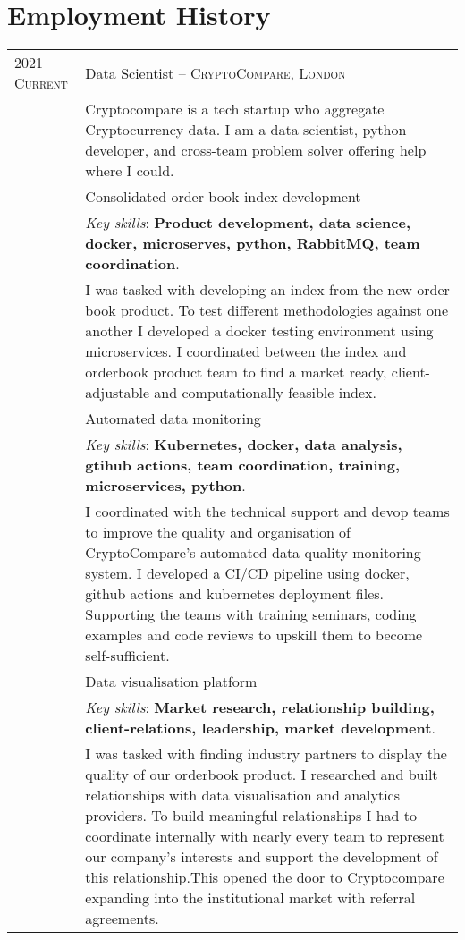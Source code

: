 \documentclass[a4paper,10pt]{article}
\newcommand{\tab}{\hspace{10 pt}}
\begin{document}
\section{Employment History}
\begin{tabular}{p{2.25cm}|p{15cm}}
%
%	
	\textsc{2021--Current} & Data Scientist -- \textsc{CryptoCompare, London}\\
	 & \footnotesize{Cryptocompare is a tech startup who aggregate Cryptocurrency data. I am a data scientist, python developer, and cross-team problem solver offering help where I could.}\\
	 & \tab Consolidated order book index development\\
	 & \footnotesize{\emph{Key skills}: \textbf{Product development, data science, docker, microserves, python, RabbitMQ, team coordination}.}\\
	 & \footnotesize{I was tasked with developing an index from the new order book product. To test different methodologies against one another I developed a docker testing environment using microservices. I coordinated between the index and orderbook product team to find a market ready, client-adjustable and computationally feasible index.} \vspace{0.05 in}\\
	 & \tab Automated data monitoring\\
	 & \footnotesize{\emph{Key skills}: \textbf{Kubernetes, docker, data analysis, gtihub actions, team coordination, training, microservices, python}.}\\
	 & \footnotesize{I coordinated with the technical support and devop teams to improve the quality and organisation of CryptoCompare’s automated data quality monitoring system. I developed a CI/CD pipeline using docker, github actions and kubernetes deployment files. Supporting the teams with training seminars, coding examples and code reviews to upskill them to become self-sufficient.} \vspace{0.05 in}\\	 
	 & \tab Data visualisation platform\\
	 & \footnotesize{\emph{Key skills}: \textbf{Market research, relationship building, client-relations, leadership, market development}.}\\
	 & \footnotesize{I was tasked with finding industry partners to display the quality of our orderbook product. I researched and built relationships with data visualisation and analytics providers. To build meaningful relationships I had to coordinate internally with nearly every team to represent our company's interests and support the development of this relationship.This opened the door to Cryptocompare expanding into the institutional market with referral agreements.} \vspace{0.05 in}\\	

\end{tabular}
\end{document}
